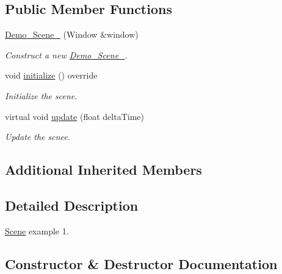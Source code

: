\subsection*{Public Member Functions}
\begin{DoxyCompactItemize}
\item 
\mbox{\hyperlink{classprz_1_1_demo___scene__01_a3f745b7fc026836cf46d570201e7f6fa}{Demo\+\_\+\+Scene\+\_}} (Window \&window)
\begin{DoxyCompactList}\small\item\em Construct a new \mbox{\hyperlink{classprz_1_1_demo___scene__01}{Demo\+\_\+\+Scene\+\_}}. \end{DoxyCompactList}\item 
void \mbox{\hyperlink{classprz_1_1_demo___scene__01_acaf389e824f310d3f3b06e1c8b510ff2}{initialize}} () override
\begin{DoxyCompactList}\small\item\em Initialize the scene. \end{DoxyCompactList}\item 
virtual void \mbox{\hyperlink{classprz_1_1_demo___scene__01_ad452238849b24043acb89b1d76f996cb}{update}} (float delta\+Time)
\begin{DoxyCompactList}\small\item\em Update the scnee. \end{DoxyCompactList}\end{DoxyCompactItemize}
\subsection*{Additional Inherited Members}


\subsection{Detailed Description}
\mbox{\hyperlink{classprz_1_1_scene}{Scene}} example 1. 



\subsection{Constructor \& Destructor Documentation}
\mbox{\label{classprz_1_1_demo___scene__01_a3f745b7fc026836cf46d570201e7f6fa}} 
